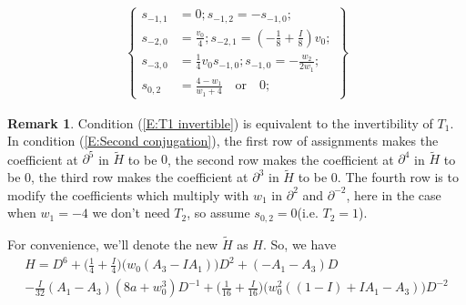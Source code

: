 \documentclass[11pt]{article}
\theoremstyle{definition}
\newtheorem{rem}{Remark}[section]
\theoremstyle{plain}
\numberwithin{equation}{section}
\begin{document}
\begin{align}
	\label{E:Second conjugation}
	\left\{\begin{aligned}
		s_{-1,1}&=0;s_{-1,2}=-s_{-1,0};
		\\s_{-2,0}&=\frac{v_0}{4};s_{-2,1}=(-\frac{1}{8}+\frac{I}{8}) v_0;
		\\s_{-3,0}&=\frac{1}{4} v_0s_{-1,0}; s_{-1,0}=-\frac{w_2}{2 w_1};
		\\s_{0,2}&=\frac{4-w_1}{w_1+4}\quad \text{or}\quad 0;
		\end{aligned}\right\}
\end{align}

\begin{rem}
Condition (\ref{E:T1 invertible}) is equivalent to the invertibility of $T_1$. In condition (\ref{E:Second conjugation}), the first row of assignments makes the coefficient at $\partial^5$ in $\tilde{H}$ to be $0$, the second row  makes the coefficient at $\partial^4$ in $\tilde{H}$ to be $0$, the third row  makes the coefficient at $\partial^3$ in $\tilde{H}$ to be $0$. The fourth row is to modify the coefficients which multiply with $w_1$ in $\partial^2$ and $\partial^{-2}$, here in the case when $w_1=-4$ we don't need $T_2$, so assume $s_{0,2}=0$(i.e. $T_2=1$).
\end{rem}

For convenience, we'll denote the new $\tilde{H}$ as $H$. So, we have 
\begin{multline*}
H=D^6+\Big(\frac{1}{4}+\frac{I}{4}\Big)\Big(w_0 (A_3-I A_1)\Big)D^2+(-A_1-A_3)D
\\-\frac{I}{32} (A_1-A_3) (8 a+w_0^3)D^{-1}+\Big(\frac{1}{16}+\frac{I}{16}\Big)\Big( w_0^2 ((1-I)+I A_1-A_3)\Big)D^{-2}
\end{multline*}
\end{document}
